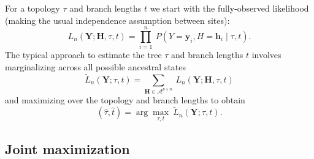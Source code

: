 \documentclass[a4paper]{article}
\newcommand{\alphabet}{\mathcal{A}}
\newcommand{\fullAlignment}{\mathbf{Y}}
\newcommand{\alignmentColumn}{\mathbf{y}}
\newcommand{\alignmentColumnRV}{Y}
\newcommand{\fullAncestralStates}{\mathbf{H}}
\newcommand{\ancestralStateColumn}{\mathbf{h}}
\newcommand{\ancestralStateColumnRV}{H}
\newcommand{\nCols}{n}
\newcommand{\nAncestralStateRows}{p}
\begin{document}
For a topology $\tau$ and branch lengths $t$ we start with the fully-observed likelihood (making the usual independence assumption between sites):
\begin{equation}
\label{eq:full_likelihood}
L_\nCols(\fullAlignment;\fullAncestralStates, \tau, t) = \prod_{i=1}^{\nCols} \ P(\alignmentColumnRV=\alignmentColumn_i, \ancestralStateColumnRV=\ancestralStateColumn_i \mid \tau, t).
\end{equation}
The typical approach to estimate the tree $\tau$ and branch lengths $t$ involves marginalizing across all possible ancestral states
\begin{equation}
\label{eq:marginal_likelihood}
\tilde{L}_\nCols(\fullAlignment; \tau, t) = \sum_{\fullAncestralStates\in\alphabet^{\nAncestralStateRows\times\nCols}} \ L_\nCols(\fullAlignment;\fullAncestralStates, \tau, t)
\end{equation}
and maximizing over the topology and branch lengths to obtain
$$
(\hat{\tau}, \hat{t}) = \arg\max_{\tau, t} \  \tilde{L}_\nCols(\fullAlignment; \tau, t).
$$

\subsection{Joint maximization}
\end{document}
